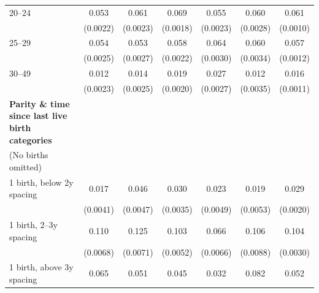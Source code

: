 {\begin{tabular}{l*{6}{c}}
\addlinespace
\hspace*{1em}20–24               &       0.053\sym{**}&       0.061\sym{**}&       0.069\sym{**}&       0.055\sym{**}&       0.060\sym{**}&       0.061\sym{**}\\
                    &    (0.0022)        &    (0.0023)        &    (0.0018)        &    (0.0023)        &    (0.0028)        &    (0.0010)        \\
\addlinespace
\hspace*{1em}25–29               &       0.054\sym{**}&       0.053\sym{**}&       0.058\sym{**}&       0.064\sym{**}&       0.060\sym{**}&       0.057\sym{**}\\
                    &    (0.0025)        &    (0.0027)        &    (0.0022)        &    (0.0030)        &    (0.0034)        &    (0.0012)        \\
\addlinespace
\hspace*{1em}30–49               &       0.012\sym{**}&       0.014\sym{**}&       0.019\sym{**}&       0.027\sym{**}&       0.012\sym{**}&       0.016\sym{**}\\
                    &    (0.0023)        &    (0.0025)        &    (0.0020)        &    (0.0027)        &    (0.0035)        &    (0.0011)        \\
\addlinespace
\textbf{Parity \& time since last live birth categories} \\ (No births omitted)&                    &                    &                    &                    &                    &                    \\
\addlinespace
\hspace*{1em}1 birth, below 2y spacing&       0.017\sym{**}&       0.046\sym{**}&       0.030\sym{**}&       0.023\sym{**}&       0.019\sym{**}&       0.029\sym{**}\\
                    &    (0.0041)        &    (0.0047)        &    (0.0035)        &    (0.0049)        &    (0.0053)        &    (0.0020)        \\
\addlinespace
\hspace*{1em}1 birth, 2–3y spacing&       0.110\sym{**}&       0.125\sym{**}&       0.103\sym{**}&       0.066\sym{**}&       0.106\sym{**}&       0.104\sym{**}\\
                    &    (0.0068)        &    (0.0071)        &    (0.0052)        &    (0.0066)        &    (0.0088)        &    (0.0030)        \\
\addlinespace
\hspace*{1em}1 birth, above 3y spacing&       0.065\sym{**}&       0.051\sym{**}&       0.045\sym{**}&       0.032\sym{**}&       0.082\sym{**}&       0.052\sym{**}\\

\end{tabular}}
